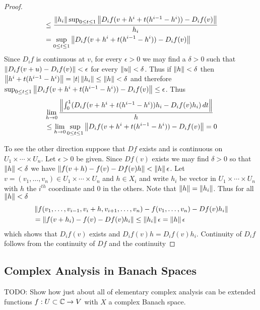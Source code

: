 \begin{proof}
\begin{align*}
&\leq \frac{\left \lVert h_i \right \rVert \sup_{0 \leq t \leq 1} \left \lVert  D_i f(v+h^i + t(h^{i-1}-h^i)) - D_i f (v)  \right \rVert}{h_i} \\
&=  \sup_{0 \leq t \leq 1} \left \lVert  D_i f(v+h^i + t(h^{i-1}-h^i)) - D_i f (v)  \right \rVert\\
\end{align*}
Since $D_i f$ is continuous at $v$, for every $\epsilon > 0$ we may find a $\delta > 0$ such that $\left \lVert D_i f(v + u) - D_i f(v) \right \rVert < \epsilon$ for every $\left \lVert u \right \rVert < \delta$.  Thus if $\left \lVert h \right \rVert < \delta$ then $\left \lVert h^i + t(h^{i-1}-h^i) \right \rVert = \left \vert t \right \vert \left \lVert h_i \right \rVert \leq \left \lVert h \right \rVert < \delta$ and therefore $\sup_{0 \leq t \leq 1} \left \lVert  D_i f(v+h^i + t(h^{i-1}-h^i)) - D_i f (v)  \right \rVert\leq \epsilon$.  Thus 
\begin{align*}
&\lim_{h \to 0} \frac{\left \lVert \int_0^1 (D_i f(v+h^i + t(h^{i-1}-h^i)) h_i - D_i f (v) h_i )\, dt \right \rVert}{h} \\
&\leq \lim_{h \to 0} \sup_{0 \leq t \leq 1} \left \lVert  D_i f(v+h^i + t(h^{i-1}-h^i)) - D_i f (v)  \right \rVert= 0
\end{align*}

To see the other direction suppose that $Df$ exists and is continuous on $U_1 \times \dotsb \times U_n$.  Let $\epsilon > 0$ be given.  Since $Df(v)$ exists we may find $\delta > 0$ so that $\left \lVert h \right \rVert < \delta$ we have $\left \lVert f(v+h) - f(v) - Df(v) h \right \rVert < \left \lVert h \right \rVert \epsilon$.   Let $v=(v_1, \dotsc, v_n) \in U_1 \times \dotsb \times U_n$ and $h \in X_i$ and write $h_i$ be vector in $U_1 \times \dotsb \times U_n$ with $h$ the $i^{th}$ coordinate and $0$ in the others.   Note that $\left \lVert h \right \rVert = \left \lVert h_i \right \rVert$.  Thus for all $\left \lVert h \right \rVert < \delta$
\begin{align*}
&\left \lVert f(v_1, \dotsc, v_{i-1}, v_i+h, v_{i+1}, \dotsc, v_n) - f(v_1, \dotsc, v_n) - Df(v) h_i \right \rVert \\
&= \left \lVert f(v + h_i) - f(v) - Df(v) h_i \right \rVert \leq \left \lVert h_i \right \rVert \epsilon = \left \lVert h \right \rVert \epsilon
\end{align*}
which shows that $D_i f(v)$ exists and $D_i f(v) h = D_i f(v) h_i$.  Continuity of $D_i f$ follows from the continuity of $Df$ and the continuity 
\end{proof}

\subsection{Complex Analysis in Banach Spaces}

TODO: Show how just about all of elementary complex analysis can be extended functions $f : U \subset \mathbb{C} \to V$ with $X$ a complex Banach space.


